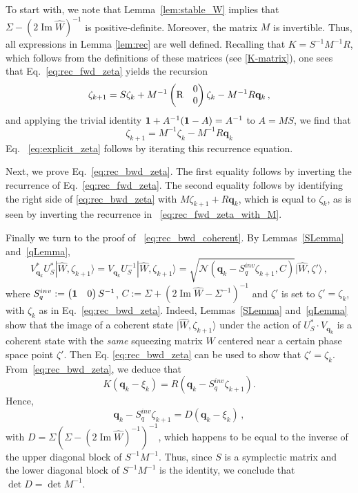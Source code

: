 \documentclass[11pt]{article}
\newcommand{\ket}[1]{|{#1}\rangle}
\renewcommand{\Im}{\operatorname{Im}}
\begin{document}
	To start with, we note that Lemma~\ref{lem:stable_W} implies that $\Sigma-(2\Im \widehat W)^{-1}$ is positive-definite. Moreover, the matrix $M$ is invertible. Thus, all expressions in Lemma \ref{lem:rec} are well defined. Recalling that 
	$K=S^{-1}M^{-1}R$, which follows from the definitions of these matrices (see \eqref{K-matrix}), one sees that Eq.~\eqref{eq:rec_fwd_zeta} yields the recursion
	$$\zeta_{k+1}= S\zeta_k +M^{-1}\begin{pmatrix}
	\multirow{2}{*}{R}&0\\&0
	\end{pmatrix}\zeta_k -M^{-1}R\mathbf{q}_k\,,$$
	and applying the trivial identity ${\bf{1}}+ A^{-1}({\bf{1}}-A)=A^{-1}$ to $A=MS$, we find that
	\begin{equation}\label{eq:rec_fwd_zeta_with_M}
	\zeta_{k+1}=M^{-1}\zeta_k-M^{-1}R\mathbf q_k
	\end{equation}
	Eq. ~\eqref{eq:explicit_zeta} follows by iterating this recurrence equation.
	
	Next, we prove Eq.~\eqref{eq:rec_bwd_zeta}. The first equality follows by inverting the recurrence of Eq.~\eqref{eq:rec_fwd_zeta}. The second equality follows by identifying the right side of \eqref{eq:rec_bwd_zeta} with $M\zeta_{k+1} +R\mathbf{q}_{k}$, which is equal to $\zeta_{k}$, as is seen by inverting the recurrence in ~\eqref{eq:rec_fwd_zeta_with_M}.
	
	Finally we turn to the proof of ~\eqref{eq:rec_bwd_coherent}. By Lemmas~\ref{SLemma} and~\ref{qLemma},
	$$V_{\mathbf q_k}^*U_S^*\ket{\widehat W,\zeta_{k+1}}=V_{\mathbf q_k}U_S^{-1}\ket{\widehat W,\zeta_{k+1}}=\sqrt{\mathcal N(\mathbf{q}_k - S^{inv}_q\zeta_{k+1},C)}\ket{\widehat W,\zeta'}\,,$$
	where $S_q^{inv}:=\begin{pmatrix}{\bf{1}} &0\end{pmatrix}S^{-1}$, $C:=\Sigma+(2\Im \widehat W -\Sigma^{-1})^{-1}$ and 
	$\zeta'$ is set to $\zeta'=\zeta_k$, with $\zeta_k$ as in Eq.~\eqref{eq:rec_bwd_zeta}. 
	Indeed, Lemmas~\ref{SLemma} and~\ref{qLemma} show that the image of a coherent state $\vert \widehat{W}, \zeta_{k+1} \rangle$ under the action of 
	$U_S^* \cdot V_{\mathbf q_k}$ is a coherent state with the \textit{same} squeezing matrix $\widehat{W}$ centered near a certain phase space point $\zeta'$. Then Eq. \eqref{eq:rec_bwd_zeta} can be used to show that $\zeta'=\zeta_k$.\\
From~\eqref{eq:rec_bwd_zeta}, we deduce that
	$$K(\mathbf{q}_{k}-\xi_{k})=R(\mathbf{q}_{k} -S_q^{inv}\zeta_{k+1}).$$
	Hence,
	$$\mathbf{q}_{k} -S_q^{inv}\zeta_{k+1}=D(\mathbf{q}_{k}-\xi_{k})\,,$$
	with $D=\Sigma(\Sigma-(2\Im \widehat W)^{-1})^{-1}$, which happens to be equal to the inverse of the upper diagonal block of $S^{-1}M^{-1}$. Thus, since $S$ is a symplectic matrix and the lower diagonal block of $S^{-1}M^{-1}$ is the identity, we conclude that $\det D=\det M^{-1}$.
	
\end{document}
